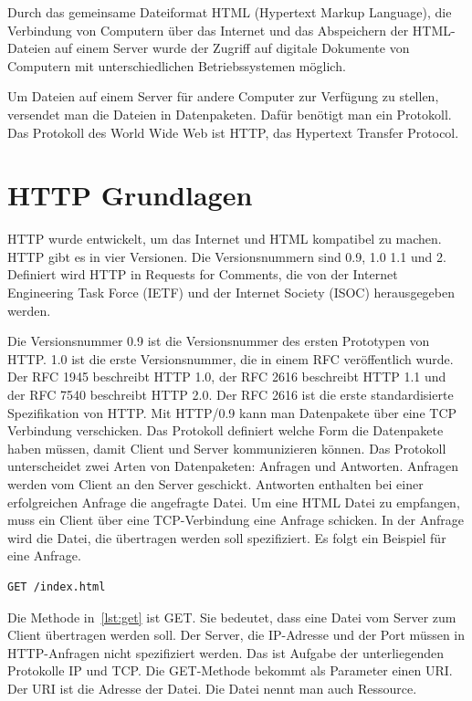\documentclass{llncs}
\begin{document}
Durch das gemeinsame Dateiformat HTML (Hypertext Markup Language), die Verbindung von Computern über das Internet und das Abspeichern der HTML-Dateien auf einem Server wurde der Zugriff auf digitale Dokumente von Computern mit unterschiedlichen Betriebssystemen möglich.

Um Dateien auf einem Server für andere Computer zur Verfügung zu stellen, versendet man die Dateien in Datenpaketen. Dafür benötigt man ein Protokoll. Das Protokoll des World Wide Web ist HTTP, das Hypertext Transfer Protocol.
\section{HTTP Grundlagen}
HTTP wurde entwickelt, um das Internet und HTML kompatibel zu machen. HTTP gibt es in vier Versionen. Die Versionsnummern sind 0.9, 1.0 1.1 und 2. Definiert wird HTTP in Requests for Comments, die von der Internet Engineering Task Force (IETF) und der Internet Society (ISOC) herausgegeben werden.

Die Versionsnummer 0.9 ist die Versionsnummer des ersten Prototypen von HTTP. 1.0 ist die erste Versionsnummer, die in einem RFC veröffentlich wurde. Der RFC 1945 beschreibt HTTP 1.0, der RFC 2616 beschreibt HTTP 1.1 und der RFC 7540 beschreibt HTTP 2.0.
Der RFC 2616 ist die erste standardisierte Spezifikation von HTTP. \cite{Fielding1999}
Mit HTTP/0.9 kann man Datenpakete über eine TCP Verbindung verschicken. Das Protokoll definiert welche Form die Datenpakete haben müssen, damit Client und Server kommunizieren können. Das Protokoll unterscheidet zwei Arten von Datenpaketen: Anfragen und Antworten. Anfragen werden vom Client an den Server geschickt. Antworten enthalten bei einer erfolgreichen Anfrage die angefragte Datei. Um eine HTML Datei zu empfangen, muss ein Client über eine TCP-Verbindung eine Anfrage schicken. In der Anfrage wird die Datei, die übertragen werden soll spezifiziert. Es folgt ein Beispiel für eine Anfrage.

\lstset{ 
  xleftmargin=.4\textwidth, xrightmargin=.2\textwidth,
  basicstyle=\ttfamily
}
\begin{lstlisting}[caption={HTTP GET-Anfrage},label={lst:get}]
GET /index.html
\end{lstlisting}

Die Methode in~\ref{lst:get} ist GET. Sie bedeutet, dass eine Datei vom Server zum Client übertragen werden soll. Der Server, die IP-Adresse und der Port müssen in HTTP-Anfragen nicht spezifiziert werden. Das ist Aufgabe der unterliegenden Protokolle IP und TCP. Die GET-Methode bekommt als Parameter einen URI. Der URI ist die Adresse der Datei. Die Datei nennt man auch Ressource.
\end{document}
